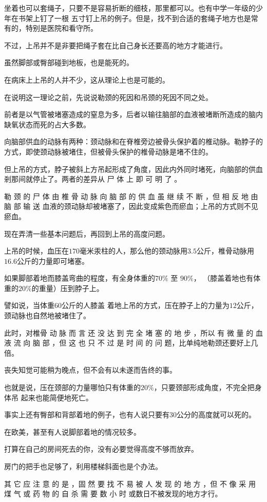 \documentclass[UTF8]{ctexart}
\begin{document}
坐着也可以套绳子，只要不是容易折断的细枝，那里都可以。也有中学一年级的少年在书架上钉了一根
五寸钉上吊的例子。但是，找不到合适的套绳子地方也是常有的，特别是医院和看守所。

不过，上吊并不是非要把绳子套在比自己身长还要高的地方才能进行。

虽然脚部或臀部碰到地板，也是能死的。

在病床上上吊的人并不少，这从理论上也是可能的。

在说明这一理论之前，先说说勒颈的死因和吊颈的死因不同之处。

前者是以气管被堵塞造成的窒息为多，后者以输往脑部的血液被堵断所造成的脑内缺氧状态而死的占大多数。

向脑部供血的动脉有两种：颈动脉和在脊椎旁边被骨头保护着的椎动脉。勒脖子的方式，即使颈动脉被堵住，但被骨头保护的椎骨动脉是堵不住的。

但上吊的方式，脖子被斜上方吊起形成了角度，因此内外同时堵死，向脑部的供血剎那间就停止了。两者的差异从 尸 体 上 即 可 明 了 。

勒 颈 的 尸 体 由 椎 骨 动 脉 向 脑 部 的 供 血 虽 继 续 不 断 ，但 相 反 地 由 脑 部 输 送 血液的颈动脉却被堵塞了，因此变成紫色而瘀血；上吊的方式则不见瘀血。

现在弄清一些基本问题后，再回到上吊的高度问题。

上吊的时候，血压在$170$毫米汞柱的人，那么他的颈动脉用$3.5$公斤，椎骨动脉用$16.6$公斤的力量即可堵塞。

如果脚部着地而膝盖弯曲的程度，有全身体重的$70\%$ 至 $90\%$， （膝盖着地也有体重的$20\%$的重量）压到脖子上。

譬如说，当体重$60$公斤的人膝盖 着地上吊的方式，压在脖子上的力量为$12$公斤，颈动脉也自然地被堵住了。

此时，对椎骨 动 脉 而 言 还 没 达 到 完 全 堵 塞 的 地 步 ，所以 有 微 量 的 血 液 流 向 脑 部 ，但 这 也 只 不 过 是 时 间 的 问 题，比单纯地勒颈还要好上几倍。

丧失知觉可能稍为晚点，但不会有以未遂而告终的事。

也就是说，压在颈部的力量哪怕只有体重的$20\%$，只要颈部形成角度，不完全把身体吊 起来也能简便地死亡。

事实上还有臀部和背部着地的例子，也有人说只要有$30$公分的高度就可以死的。

在欧美，甚至有人说脚部着地的情况较多。

打算在自己的房间死去的你，没有必要觉得高度不够而放弃。

房门的把手也足够了，利用楼梯斜面也是个办法。

其 它 应 注 意 的 是 ，固 然 要 找 不 易 被 人 发 现 的 地 方 ，但 不 像 采 用 煤 气 或 药 物 的 自 杀 需 要 数 小 时 或数日不被发现的地方才行。
\end{document}
